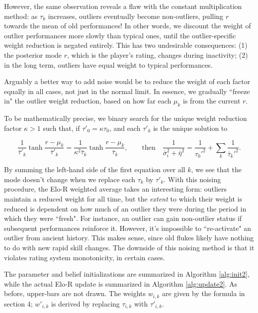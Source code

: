 However, the same observation reveals a flaw with the constant multiplication method: as $\tau_k$ increases, outliers eventually become non-outliers, pulling $r$ towards the mean of old performances! In other words, we discount the weight of outlier performances more slowly than typical ones, until the outlier-specific weight reduction is negated entirely. This has two undesirable consequences: (1) the posterior mode $r$, which is the player's rating, changes during inactivity; (2) in the long term, outliers have equal weight to typical performances.

Arguably a better way to add noise would be to reduce the weight of each factor equally in all cases, not just in the normal limit. In essence, we gradually ``freeze in" the outlier weight reduction, based on how far each $\mu_k$ is from the current $r$.

To be mathematically precise, we binary search for the unique weight reduction factor $\kappa>1$ such that, if $\tau'_0=\kappa\tau_0$, and each $\tau'_k$ is the unique solution to

\[
\frac{1}{\bar\tau'_k} \tanh \frac {r-\mu_k} {\bar\tau'_k}
= \frac{1}{\kappa^2\bar\tau_k} \tanh \frac {r-\mu_k} {\bar\tau_k},\qquad
\text{then} \quad \frac{1}{\bar\sigma_i^2 + \bar\eta^2}
= \frac{1}{\tau_0'^2} + \sum_k \frac{1}{\bar\tau_k'^2}.
\]

By summing the left-hand side of the first equation over all $k$, we see that the mode doesn't change when we replace each $\tau_k$ by $\tau'_k$. With this noising procedure, the Elo-R weighted average takes an interesting form: outliers maintain a reduced weight for all time, but the \textit{extent} to which their weight is reduced is dependent on how much of an outlier they were during the period in which they were ``fresh". For instance, an outlier can gain non-outlier status if subsequent performances reinforce it. However, it's impossible to ``re-activate" an outlier from ancient history. This makes sense, since old flukes likely have nothing to do with new rapid skill changes. The downside of this noising method is that it violates rating system monotonicity, in certain cases.

The parameter and belief initializations are summarized in Algorithm \ref{alg:init2}, while the actual Elo-R update is summarized in Algorithm \ref{alg:update2}. As before, upper-bars are not drawn. The weights $w_{i,k}$ are given by the formula in section 4; $w'_{i,k}$ is derived by replacing $\tau_{i,k}$ with $\tau'_{i,k}$.

